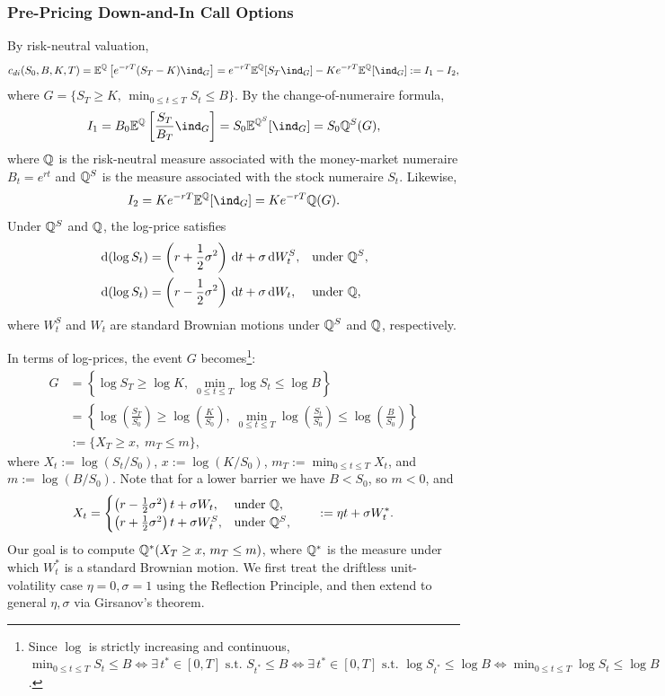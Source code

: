 \subsubsection*{Pre-Pricing Down-and-In Call Options}

By risk-neutral valuation,
\[
c_{di}(S_0, B, K, T) = \E^{\Q}\left[e^{-rT}(S_T - K)\ind_G\right] = e^{-rT}\E^{\Q}[S_T \ind_G] - K e^{-rT}\E^{\Q}[\ind_G] := I_1 - I_2,
\]
where $G = \{S_T \ge K,\, \min_{0 \le t \le T} S_t \le B\}$. By the change-of-numeraire formula,
\[
I_1 = B_0 \E^{\Q}\left[\frac{S_T}{B_T}\ind_G\right] = S_0 \E^{\Q^S}[\ind_G] = S_0 \Q^S(G),
\]
where $\mathbb{Q}$ is the risk-neutral measure associated with the money-market numeraire $B_t = e^{rt}$ and $\mathbb{Q}^S$ is the measure associated with the stock numeraire $S_t$. Likewise,
\[
I_2 = K e^{-rT}\E^{\Q}[\ind_G] = K e^{-rT}\Q(G).
\]
Under $\mathbb{Q}^S$ and $\mathbb{Q}$, the log-price satisfies
\[
\begin{aligned}
    \,\mathrm{d}(\log S_t) &= \left(r + \frac{1}{2}\sigma^2\right)\,\mathrm{d} t + \sigma \,\mathrm{d} W_t^S, && \text{under } \mathbb{Q}^S, \\
    \,\mathrm{d}(\log S_t) &= \left(r - \frac{1}{2}\sigma^2\right)\,\mathrm{d} t + \sigma \,\mathrm{d} W_t, && \text{under } \mathbb{Q},
\end{aligned}
\]
where $W_t^S$ and $W_t$ are standard Brownian motions under $\mathbb{Q}^S$ and $\mathbb{Q}$, respectively.

In terms of log-prices, the event $G$ becomes\footnote{Since $\log$ is strictly increasing and continuous, $\min_{0 \le t \le T} S_t \le B \iff \exists\, t^* \in [0, T] \text{ s.t.\ } S_{t^*} \le B \iff \exists\, t^* \in [0, T] \text{ s.t.\ } \log S_{t^*} \le \log B \iff \min_{0 \le t \le T} \log S_t \le \log B$.}:
\[
\begin{aligned}
    G &= \left\{\log S_T \ge \log K,\; \min_{0 \le t \le T} \log S_t \le \log B\right\} \\
      &= \left\{\log\left(\frac{S_T}{S_0}\right) \ge \log\left(\frac{K}{S_0}\right),\; \min_{0 \le t \le T} \log\left(\frac{S_t}{S_0}\right) \le \log\left(\frac{B}{S_0}\right)\right\} \\
      &:= \{X_T \ge x,\; m_T \le m\},
\end{aligned}
\]
where $X_t := \log(S_t/S_0)$, $x := \log(K/S_0)$, $m_T := \min_{0 \le t \le T} X_t$, and $m := \log(B/S_0)$. Note that for a lower barrier we have $B < S_0$, so $m < 0$, and
\[
X_t = \begin{cases}
    \left(r - \frac{1}{2}\sigma^2\right)t + \sigma W_t, & \text{under } \mathbb{Q}, \\
    \left(r + \frac{1}{2}\sigma^2\right)t + \sigma W_t^S, & \text{under } \mathbb{Q}^S,
\end{cases}
\qquad := \eta t + \sigma W_t^*.
\]
Our goal is to compute $\mathbb{Q}^*(X_T \ge x,\, m_T \le m)$, where $\mathbb{Q}^*$ is the measure under which $W_t^*$ is a standard Brownian motion. We first treat the driftless unit-volatility case $\eta = 0, \sigma = 1$ using the Reflection Principle, and then extend to general $\eta, \sigma$ via Girsanov's theorem.

